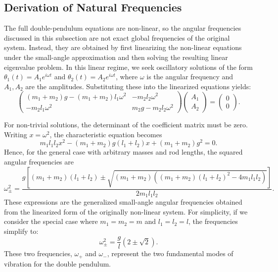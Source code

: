 \documentclass[12pt, a4paper, twoside]{article}
\begin{document}
\subsection{Derivation of Natural Frequencies}
The full double-pendulum equations are non-linear, so the angular frequencies discussed in this subsection are not exact global frequencies of the original system. Instead, they are obtained by first linearizing the non-linear equations under the small-angle approximation and then solving the resulting linear eigenvalue problem. In this linear regime, we seek oscillatory solutions of the form $\theta_1(t) = A_1 e^{i\omega t}$ and $\theta_2(t) = A_2 e^{i\omega t}$, where $\omega$ is the angular frequency and $A_1, A_2$ are the amplitudes. Substituting these into the linearized equations yields:
\begin{equation}
\begin{pmatrix}
(m_1 + m_2)g - (m_1 + m_2)l_1\omega^2 & -m_2 l_2 \omega^2 \\
-m_2 l_1 \omega^2 & m_2 g - m_2 l_2 \omega^2
\end{pmatrix}
\begin{pmatrix}
A_1 \\ A_2
\end{pmatrix} = \begin{pmatrix} 0 \\ 0 \end{pmatrix}.
\end{equation}

For non-trivial solutions, the determinant of the coefficient matrix must be zero. Writing $x=\omega^2$, the characteristic equation becomes
\begin{equation}
m_1 l_1 l_2 x^2 - (m_1 + m_2)g(l_1 + l_2)x + (m_1 + m_2)g^2 = 0.
\end{equation}
Hence, for the general case with arbitrary masses and rod lengths, the squared angular frequencies are
\begin{equation}
\omega_{\pm}^2 =
\frac{g\left[(m_1 + m_2)(l_1 + l_2) \pm \sqrt{(m_1 + m_2)\left((m_1 + m_2)(l_1 + l_2)^2 - 4m_1 l_1 l_2\right)}\right]}{2m_1 l_1 l_2}.
\end{equation}
These expressions are the generalized small-angle angular frequencies obtained from the linearized form of the originally non-linear system. For simplicity, if we consider the special case where $m_1 = m_2 = m$ and $l_1 = l_2 = l$, the frequencies simplify to:
\begin{equation}
\omega_{\pm}^2 = \frac{g}{l} \left( 2 \pm \sqrt{2} \right).
\end{equation}
These two frequencies, $\omega_+$ and $\omega_-$, represent the two fundamental modes of vibration for the double pendulum.
\end{document}
